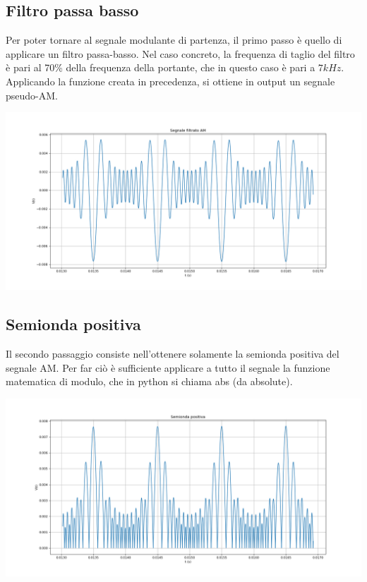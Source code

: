 \documentclass{article}
\begin{document}
\subsection{Filtro passa basso}
Per poter tornare al segnale modulante di partenza, il primo passo è quello di applicare un filtro passa-basso.
Nel caso concreto, la frequenza di taglio del filtro è pari al 70\% della frequenza della portante, che in 
questo caso è pari a $7 kHz$.
\\
Applicando la funzione creata in precedenza, si ottiene in output un segnale pseudo-AM.

\begin{center}
    \includegraphics[width=\textwidth]{filtrato.png}
\end{center}

\subsection{Semionda positiva}
Il secondo passaggio consiste nell'ottenere solamente la semionda positiva del segnale AM. Per far ciò è sufficiente
applicare a tutto il segnale la funzione matematica di modulo, che in python si chiama abs (da absolute).

\begin{center}
    \includegraphics[width=\textwidth]{positivo.png}
\end{center}
\end{document}
